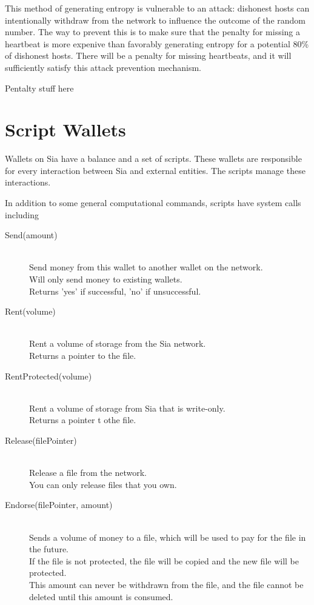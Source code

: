 \documentclass[twocolumn]{article}
\begin{document}
This method of generating entropy is vulnerable to an attack: dishonest hosts can intentionally withdraw from the network to influence the outcome of the random number.
The way to prevent this is to make sure that the penalty for missing a heartbeat is more expenive than favorably generating entropy for a potential 80\% of dishonest hosts.
There will be a penalty for missing heartbeats, and it will sufficiently satisfy this attack prevention mechanism.

\begin{center}
Pentalty stuff here
\end{center}

\section{Script Wallets}

Wallets on Sia have a balance and a set of scripts.
These wallets are responsible for every interaction between Sia and external entities.
The scripts manage these interactions.

In addition to some general computational commands, scripts have system calls including

\begin{description}
	\item[Send(amount)] \hfill \\
	Send money from this wallet to another wallet on the network. \\
	Will only send money to existing wallets. \\
	Returns 'yes' if successful, 'no' if unsuccessful.
	\item[Rent(volume)] \hfill \\
	Rent a volume of storage from the Sia network. \\
	Returns a pointer to the file.
	\item[RentProtected(volume)] \hfill \\
	Rent a volume of storage from Sia that is write-only. \\
	Returns a pointer t othe file.
	\item[Release(filePointer)] \hfill \\
	Release a file from the network. \\
	You can only release files that you own.
	\item[Endorse(filePointer, amount)] \hfill \\
	Sends a volume of money to a file, which will be used to pay for the file in the future. \\
	If the file is not protected, the file will be copied and the new file will be protected. \\
	This amount can never be withdrawn from the file, and the file cannot be deleted until this amount is consumed.
\end{description}
\end{document}
